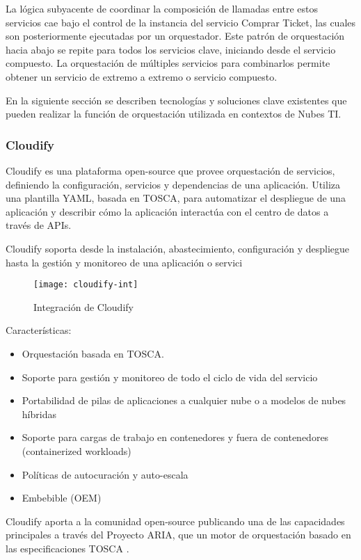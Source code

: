         La lógica subyacente de coordinar la composición de llamadas entre estos servicios cae bajo el control de la instancia del servicio Comprar Ticket, las cuales son posteriormente ejecutadas por un orquestador.  Este patrón de orquestación hacia abajo se repite para todos los servicios clave, iniciando desde el servicio compuesto. La orquestación de múltiples servicios para combinarlos permite obtener un servicio de extremo a extremo o servicio compuesto. 
        
        En la siguiente sección se describen tecnologías y soluciones clave existentes que pueden realizar la función de orquestación utilizada en contextos de Nubes TI.
	    
	    \subsubsection{Cloudify}
        Cloudify \parencite{Cloudify2016-qi} es una plataforma open-source que provee orquestación de servicios, definiendo la configuración, servicios y dependencias de una aplicación. Utiliza una plantilla YAML, basada en TOSCA, para automatizar el despliegue de una aplicación y describir cómo la aplicación interactúa con el centro de datos a través de APIs.
        
        Cloudify soporta desde la instalación, abastecimiento, configuración y despliegue hasta la gestión y monitoreo de una aplicación o servici
    	    
\begin{figure}[H]
    \centering
    \texttt{[image: cloudify-int]}
    \caption{Integración de Cloudify \parencite{Cloudify2016-je}}
    \label{fig:cloudify-int}
\end{figure}
    
Características:
\begin{itemize}
\item Orquestación basada en TOSCA.
\item Soporte para gestión y monitoreo de todo el ciclo de vida del servicio
\item Portabilidad de pilas de aplicaciones a cualquier nube o a modelos de nubes híbridas
\item Soporte para cargas de trabajo en contenedores y fuera de contenedores (containerized workloads)
\item Políticas de autocuración y auto-escala
\item Embebible (OEM)
\end{itemize}
Cloudify aporta a la comunidad open-source publicando una de las capacidades principales a través del Proyecto ARIA, que un motor de orquestación basado en las especificaciones TOSCA 
\parencite{Oasis2016-sk}.

